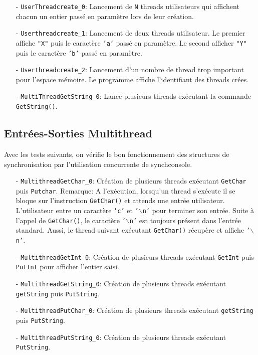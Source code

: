 \documentclass[11pt]{article}
\theoremstyle{definition}
\theoremstyle{definition}
\begin{document}
\begin{itemize}
\item[-] \texttt{UserThreadcreate\_0}: Lancement de \texttt{N} threads utilisateurs qui affichent chacun un entier passé en paramètre lors de leur
  création.
\item[-] \texttt{Userthreadcreate\_1}: Lancement de deux threads utilisateur. Le premier affiche \texttt{"X"} puis le caractère \texttt{'a'} passé en paramètre.
  Le second afficher \texttt{"Y"} puis le caractère \texttt{'b'} passé en paramètre.
\item[-] \texttt{Userthreadcreate\_2}: Lancement d'un nombre de thread trop important pour l'espace mémoire.
  Le programme affiche l'identifiant des threads crées.
\item[-] \texttt{MultiThreadGetString\_0}: Lance plusieurs threads exécutant la commande \texttt{GetString()}.
\end{itemize}

\subsection{Entrées-Sorties Multithread}
 Avec les tests suivants, on vérifie le bon fonctionnement des structures de synchronisation par l'utilisation
  concurrente de synchconsole.
\begin{itemize}
\item[-] \texttt{MultithreadGetChar\_0}: Création de plusieurs threads exécutant \texttt{GetChar}
  puis \texttt{Putchar}.
  Remarque:
  A l'exécution, lorsqu'un thread s'exécute il se bloque sur l'instruction \texttt{GetChar()} et attends une
  entrée utilisateur. L'utilisateur entre un caractère \texttt{'c'} et \texttt{'$\backslash$n'} pour terminer son entrée.
  Suite à l'appel de \texttt{GetChar()}, le caractère \texttt{'$\backslash$n'} est toujours
  présent dans l'entrée standard. Aussi, le thread suivant exécutant \texttt{GetChar()} récupère et
  affiche \texttt{'$\backslash$n'}.
\item[-] \texttt{MultithreadGetInt\_0}: Création de plusieurs threads exécutant \texttt{GetInt}
  puis \texttt{PutInt} pour afficher l'entier saisi.
\item[-] \texttt{MultithreadGetString\_0}: Création de plusieurs threads exécutant
  \texttt{getString} puis \texttt{PutString}.
\item[-] \texttt{MultithreadPutChar\_0}: Création de plusieurs threads exécutant \texttt{getString}
  puis \texttt{PutString}.
\item[-] \texttt{MultithreadPutString\_0}: Création de plusieurs threads exécutant \texttt{PutString}.
\end{itemize}
\end{document}
